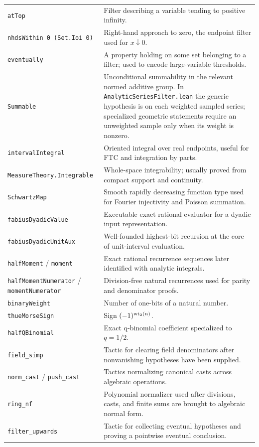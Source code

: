 \documentclass[11pt,oneside]{article}
\theoremstyle{definition}
\theoremstyle{remark}
\begin{document}
\begin{longtable}{>{\raggedright\arraybackslash}p{} >{\raggedright\arraybackslash}p{}}
\nolinkurl{atTop} & Filter describing a variable tending to positive infinity. \\
\nolinkurl{nhdsWithin 0 (Set.Ioi 0)} & Right-hand approach to zero, the endpoint filter used for \(x\downarrow0\). \\
\nolinkurl{eventually} & A property holding on some set belonging to a filter; used to encode large-variable thresholds. \\
\nolinkurl{Summable} & Unconditional summability in the relevant normed additive group.  In \nolinkurl{AnalyticSeriesFilter.lean} the generic hypothesis is on each weighted sampled series; specialized geometric statements require an unweighted sample only when its weight is nonzero. \\
\nolinkurl{intervalIntegral} & Oriented integral over real endpoints, useful for FTC and integration by parts. \\
\nolinkurl{MeasureTheory.Integrable} & Whole-space integrability; usually proved from compact support and continuity. \\
\nolinkurl{SchwartzMap} & Smooth rapidly decreasing function type used for Fourier injectivity and Poisson summation. \\
\nolinkurl{fabiusDyadicValue} & Executable exact rational evaluator for a dyadic input representation. \\
\nolinkurl{fabiusDyadicUnitAux} & Well-founded highest-bit recursion at the core of unit-interval evaluation. \\
\nolinkurl{halfMoment} / \nolinkurl{moment} & Exact rational recurrence sequences later identified with analytic integrals. \\
\nolinkurl{halfMomentNumerator} / \nolinkurl{momentNumerator} & Division-free natural recurrences used for parity and denominator proofs. \\
\nolinkurl{binaryWeight} & Number of one-bits of a natural number. \\
\nolinkurl{thueMorseSign} & Sign \((-1)^{\operatorname{wt}_{2}(n)}\). \\
\nolinkurl{halfQBinomial} & Exact q-binomial coefficient specialized to \(q=1/2\). \\
\nolinkurl{field_simp} & Tactic for clearing field denominators after nonvanishing hypotheses have been supplied. \\
\nolinkurl{norm_cast} / \nolinkurl{push_cast} & Tactics normalizing canonical casts across algebraic operations. \\
\nolinkurl{ring_nf} & Polynomial normalizer used after divisions, casts, and finite sums are brought to algebraic normal form. \\
\nolinkurl{filter_upwards} & Tactic for collecting eventual hypotheses and proving a pointwise eventual conclusion. \\
\bottomrule
\end{longtable}
\end{document}
